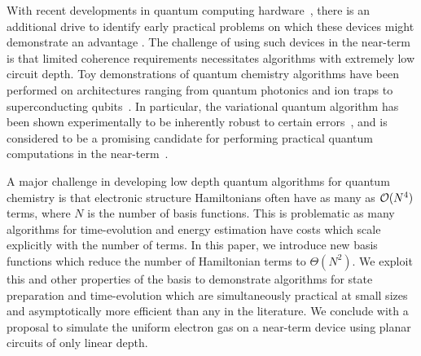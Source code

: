 \documentclass[superscriptaddress,aps,pra,nofootinbib,notitlepage,10pt,longbibliography]{revtex4-1}
\begin{document}
With recent developments in quantum computing hardware~\cite{Corcoles2015,Riste2015,Kelly2015,Barends2016,Roushan2017}, there is an additional drive to identify early practical problems on which these devices might demonstrate an advantage \cite{Mohseni2017,Boixo2016}. The challenge of using such devices in the near-term is that limited coherence requirements necessitates algorithms with extremely low circuit depth. Toy demonstrations of quantum chemistry algorithms have been performed on architectures ranging from quantum photonics and ion traps to superconducting qubits~\cite{Lanyon2010,Li2011,Wang2014,Peruzzo2013,Shen2015,OMalley2016,Kandala2017}. In particular, the variational quantum algorithm \cite{Peruzzo2013,McClean2015} has been shown experimentally to be inherently robust to certain errors~\cite{OMalley2016}, and is considered to be a promising candidate for performing practical quantum computations in the near-term~\cite{Wecker2015a,Mueck2015}.

A major challenge in developing low depth quantum algorithms for quantum chemistry is that electronic structure Hamiltonians often have as many as ${\cal O}(N^4)$ terms, where $N$ is the number of basis functions. This is problematic as many algorithms for time-evolution and energy estimation have costs which scale explicitly with the number of terms. In this paper, we introduce new basis functions which reduce the number of Hamiltonian terms to $\Theta(N^2)$. We exploit this and other properties of the basis to demonstrate algorithms for state preparation and time-evolution which are simultaneously practical at small sizes and asymptotically more efficient than any in the literature. We conclude with a proposal to simulate the uniform electron gas on a near-term device using planar circuits of only linear depth.
\end{document}
